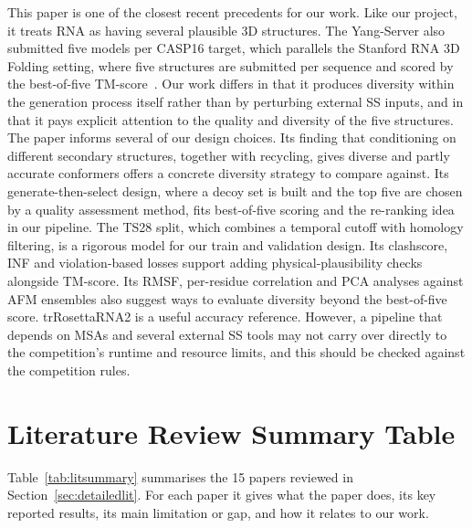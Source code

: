 \documentclass{FastFyp}
\begin{document}
This paper is one of the closest recent precedents for our work. Like our project, it treats RNA as having several plausible 3D structures. The Yang-Server also submitted five models per CASP16 target, which parallels the Stanford RNA 3D Folding setting, where five structures are submitted per sequence and scored by the best-of-five TM-score~\cite{leerna}. Our work differs in that it produces diversity within the generation process itself rather than by perturbing external SS inputs, and in that it pays explicit attention to the quality and diversity of the five structures. The paper informs several of our design choices. Its finding that conditioning on different secondary structures, together with recycling, gives diverse and partly accurate conformers offers a concrete diversity strategy to compare against. Its generate-then-select design, where a decoy set is built and the top five are chosen by a quality assessment method, fits best-of-five scoring and the re-ranking idea in our pipeline. The TS28 split, which combines a temporal cutoff with homology filtering, is a rigorous model for our train and validation design. Its clashscore, INF and violation-based losses support adding physical-plausibility checks alongside TM-score. Its RMSF, per-residue correlation and PCA analyses against AFM ensembles also suggest ways to evaluate diversity beyond the best-of-five score. trRosettaRNA2 is a useful accuracy reference. However, a pipeline that depends on MSAs and several external SS tools may not carry over directly to the competition's runtime and resource limits, and this should be checked against the competition rules.

\section{Literature Review Summary Table}

Table~\ref{tab:litsummary} summarises the 15 papers reviewed in Section~\ref{sec:detailedlit}. For each paper it gives what the paper does, its key reported results, its main limitation or gap, and how it relates to our work.
\end{document}
